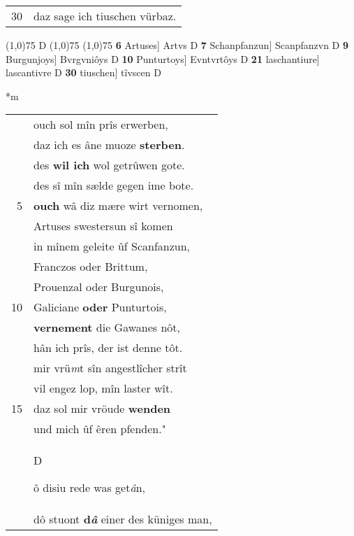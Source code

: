 \documentclass[8pt,a4paper,notitlepage]{article}
\begin{document}
\begin{table}[ht]
\begin{minipage}[t]{0.5\linewidth}
\begin{tabular}{rl}
30 & daz sage ich tiuschen vürbaz.\\ 
\end{tabular}
\scriptsize
\line(1,0){75} \newline
D \newline
\line(1,0){75} \newline
\newline
\line(1,0){75} \newline
\textbf{6} Artuses] Artvs D \textbf{7} Schanpfanzun] Scanpfanzvn D \textbf{9} Burgunjoys] Bvrgvniôys D \textbf{10} Punturtoys] Evntvrtôys D \textbf{21} laschantiure] lascantivre D \textbf{30} tiuschen] tîvscen D \newline
\end{minipage}
\hspace{0.5cm}
\begin{minipage}[t]{0.5\linewidth}
\small
\begin{center}*m
\end{center}
\begin{tabular}{rl}
 & ouch sol mîn prîs erwerben,\\ 
 & daz ich es âne muoze \textbf{sterben}.\\ 
 & des \textbf{wil ich} wol getrûwen gote.\\ 
 & des sî mîn sælde gegen ime bote.\\ 
5 & \textbf{ouch} wâ diz mære wirt vernomen,\\ 
 & Artuses swestersun sî komen\\ 
 & in mînem geleite ûf Scanfanzun,\\ 
 & Franczos oder Brittum,\\ 
 & Prouenzal oder Burgunois,\\ 
10 & Galiciane \textbf{oder} Punturtois,\\ 
 & \textbf{vernement} die Gawanes nôt,\\ 
 & hân ich prîs, der ist denne tôt.\\ 
 & mir vrü\textit{m}t sîn angestlîcher strît\\ 
 & vil engez lop, mîn laster wît.\\ 
15 & daz sol mir vröude \textbf{wenden}\\ 
 & und mich ûf êren pfenden."\\ 
 & \begin{large}D\end{large}ô disiu rede was get\textit{â}n,\\ 
 & dô stuont \textbf{d\textit{â}} einer des küniges man,\\ 

\end{tabular}
\end{minipage}
\end{table}
\end{document}
